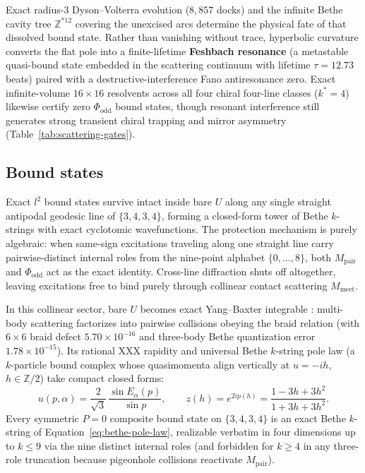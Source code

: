 Exact radius-3 Dyson--Volterra evolution ($8{,}857$ docks) and the infinite Bethe cavity tree $\mathbb{Z}^{*12}$ covering
the unexcised arcs determine the physical fate of that dissolved bound state. Rather than vanishing without trace,
hyperbolic curvature converts the flat pole into a finite-lifetime \textbf{Feshbach resonance} (a metastable quasi-bound
state embedded in the scattering continuum with lifetime $\tau = 12.73$ beats) paired with a destructive-interference Fano
antiresonance zero. Exact infinite-volume $16 \times 16$ resolvents across all four chiral four-line classes ($k^* = 4$)
likewise certify zero $\Phi_{\mathrm{odd}}$ bound states, though resonant interference still generates strong transient
chiral trapping and mirror asymmetry (Table~\ref{tab:scattering-gates}).

\subsection{Bound states}

Exact $l^2$ bound states survive intact inside bare $U$ along any single straight antipodal geodesic line of
$\{3,4,3,4\}$, forming a closed-form tower of Bethe $k$-strings with exact cyclotomic wavefunctions. The protection
mechanism is purely algebraic: when same-sign excitations traveling along one straight line carry pairwise-distinct
internal roles from the nine-point alphabet $\{0, \dots, 8\}$, both $M_{\mathrm{pair}}$ and $\Phi_{\mathrm{odd}}$ act
as the exact identity. Cross-line diffraction shuts off altogether, leaving excitations free to bind purely through
collinear contact scattering $M_{\mathrm{meet}}$.

In this collinear sector, bare $U$ becomes exact Yang--Baxter integrable \cite{yang1967, baxter1972}: multi-body
scattering factorizes into pairwise collisions obeying the braid relation (with $6 \times 6$ braid defect
$5.70 \times 10^{-16}$ and three-body Bethe quantization error $1.78 \times 10^{-15}$). Its rational XXX rapidity and
universal Bethe $k$-string pole law (a $k$-particle bound complex whose quasimomenta align vertically at $u = -i h$,
$h \in \mathbb{Z}/2$) take compact closed forms:
\begin{equation}
u(p, \alpha) = \frac{2}{\sqrt{3}}\,\frac{\sin E_\alpha(p)}{\sin p},
\qquad
z(h) = e^{2 i p(h)} = \frac{1 - 3h + 3h^2}{1 + 3h + 3h^2}.
\label{eq:bethe-pole-law}
\end{equation}
Every symmetric $P = 0$ composite bound state on $\{3,4,3,4\}$ is an exact Bethe $k$-string of
Equation~\eqref{eq:bethe-pole-law}, realizable verbatim in four dimensions up to $k \le 9$ via the nine distinct internal
roles (and forbidden for $k \ge 4$ in any three-role truncation because pigeonhole collisions reactivate
$M_{\mathrm{pair}}$).

